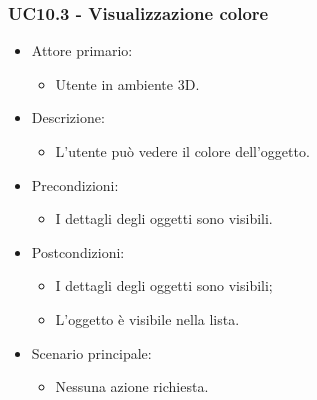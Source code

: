 \subsubsection{UC10.3 - Visualizzazione colore}
\begin{itemize}

	\item Attore primario: 
	\begin{itemize}
		\item Utente in ambiente 3D.
	\end{itemize}
	\item Descrizione:
	\begin{itemize}
		\item L'utente può vedere il colore dell'oggetto.
	\end{itemize}
	
	\item Precondizioni:
	\begin{itemize}
		\item I dettagli degli oggetti sono visibili.
	\end{itemize}
	
	\item Postcondizioni:
	\begin{itemize}
		\item  I dettagli degli oggetti sono visibili;
		\item L'oggetto è visibile nella lista.
	\end{itemize}
	
	\item Scenario principale:
	\begin{itemize}
		\item Nessuna azione richiesta.
	\end{itemize}
	
\end{itemize}

